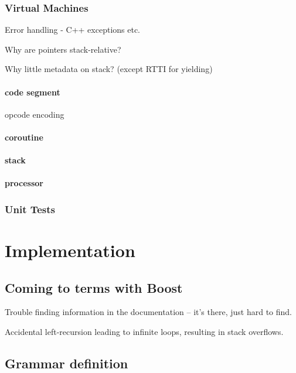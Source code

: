         \subsection{Virtual Machines}
        
            Error handling - C++ exceptions etc.
            
            Why are pointers stack-relative?
            
            Why little metadata on stack? (except RTTI for yielding)
            
            \subsubsection{code segment}
                opcode encoding
            \subsubsection{coroutine}
            \subsubsection{stack}
            \subsubsection{processor}
        
        \subsection{Unit Tests}


\chapter{Implementation}

    
    \section{Coming to terms with Boost}
    
        Trouble finding information in the documentation -- it's there, just hard to find.
        
        Accidental left-recursion leading to infinite loops, resulting in stack overflows.
    
    \section{Grammar definition}
    
